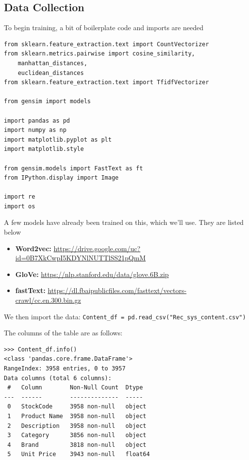 \documentclass{article}
\begin{document}
\subsection{Data Collection}

To begin training, a bit of boilerplate code and imports are needed

\begin{lstlisting}
from sklearn.feature_extraction.text import CountVectorizer
from sklearn.metrics.pairwise import cosine_similarity,
    manhattan_distances,
    euclidean_distances
from sklearn.feature_extraction.text import TfidfVectorizer

from gensim import models

import pandas as pd
import numpy as np
import matplotlib.pyplot as plt
import matplotlib.style

from gensim.models import FastText as ft
from IPython.display import Image

import re
import os
\end{lstlisting}

A few models have already been trained on this, which we'll use. They are listed below

\begin{itemize}
    \item{\textbf{Word2vec:} \url{https://drive.google.com/uc?id=0B7XkCwpI5KDYNlNUTTlSS21pQmM}}
    \item{\textbf{GloVe:} \url{https://nlp.stanford.edu/data/glove.6B.zip}}
    \item{\textbf{fastText:} \url{https://dl.fbaipublicfiles.com/fasttext/vectors-crawl/cc.en.300.bin.gz}}
\end{itemize}

We then import the data: \texttt{Content\_df = pd.read\_csv("Rec\_sys\_content.csv")}

The columns of the table are as follows:

\begin{lstlisting}
>>> Content_df.info()
<class 'pandas.core.frame.DataFrame'>
RangeIndex: 3958 entries, 0 to 3957
Data columns (total 6 columns):
 #   Column        Non-Null Count  Dtype
---  ------        --------------  -----
 0   StockCode     3958 non-null   object
 1   Product Name  3958 non-null   object
 2   Description   3958 non-null   object
 3   Category      3856 non-null   object
 4   Brand         3818 non-null   object
 5   Unit Price    3943 non-null   float64
\end{lstlisting}
\end{document}
